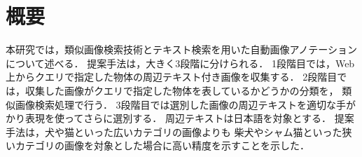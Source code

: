 \chapter*{概要}
本研究では，類似画像検索技術とテキスト検索を用いた自動画像アノテーションについて述べる．
提案手法は，大きく3段階に分けられる．
1段階目では，Web上からクエリで指定した物体の周辺テキスト付き画像を収集する．
2段階目では，収集した画像がクエリで指定した物体を表しているかどうかの分類を，
類似画像検索処理で行う．
3段階目では選別した画像の周辺テキストを適切な手がかり表現を使ってさらに選別する．
周辺テキストは日本語を対象とする．
提案手法は，犬や猫といった広いカテゴリの画像よりも
柴犬やシャム猫といった狭いカテゴリの画像を対象とした場合に高い精度を示すことを示した．